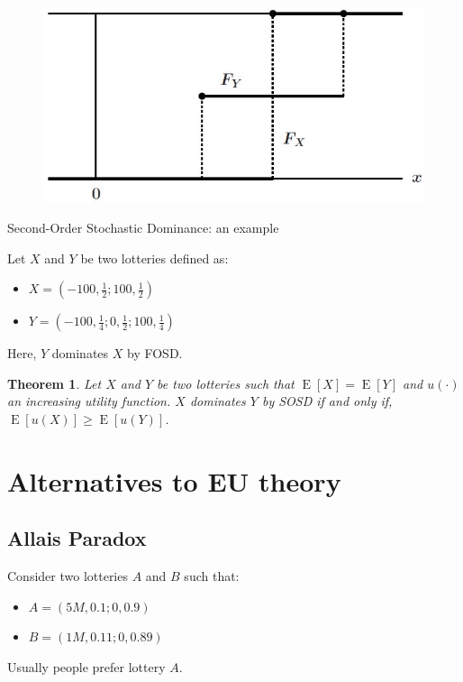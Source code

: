 \documentclass[12pt]{report}
\newtheorem{theorem}{Theorem}[chapter]
\newcommand{\E}[1]{\operatorname{E}\left[#1\right]}
\begin{document}
\begin{figure}[ht!]
\centering
\includegraphics[scale=0.33]{images/sosd}
\end{figure}

\begin{bclogo}[couleur=blue!10, arrondi=0.1, logo=,ombre=false]{ Second-Order Stochastic Dominance: an example} 
\begin{small}
Let $X$ and $Y$ be two lotteries defined as: \begin{itemize}
\item $X = \left(-100, \frac{1}{2}; 100, \frac{1}{2}\right)$
\item $Y = \left(-100, \frac{1}{4}; 0, \frac{1}{2}; 100, \frac{1}{4}\right)$
\end{itemize}
Here, $Y$ dominates $X$ by FOSD.
\end{small}
\end{bclogo}

\begin{theorem}
Let $X$ and $Y$ be two lotteries such that $\E{X} = \E{Y}$ and $u(\cdot)$ an increasing utility function. $X$ dominates $Y$ by SOSD if and only if, $\E{u(X)} \geq	\E{u(Y)}$.
\end{theorem}

\chapter{Alternatives to EU theory}

\section{Allais Paradox}

Consider two lotteries $A$ and $B$ such that:\begin{itemize}
\item $A = (5M, 0.1; 0, 0.9)$
\item $B = (1M, 0.11; 0, 0.89)$
\end{itemize}
Usually people prefer lottery $A$.
\end{document}

